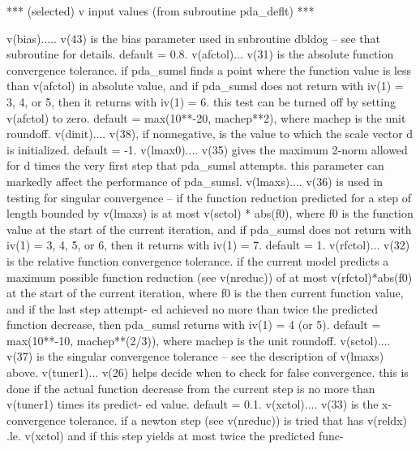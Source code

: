 \documentclass[11pt,twoside,nolof]{starlink}
\begin{document}
\begin{terminalv}
   ***  (selected) v input values (from subroutine pda_deflt)  ***

  v(bias)..... v(43) is the bias parameter used in subroutine dbldog --
              see that subroutine for details.  default = 0.8.
  v(afctol)... v(31) is the absolute function convergence tolerance.
              if pda_sumsl finds a point where the function value is less
              than v(afctol) in absolute value, and if pda_sumsl does not
              return with iv(1) = 3, 4, or 5, then it returns with
              iv(1) = 6.  this test can be turned off by setting
              v(afctol) to zero.  default = max(10**-20, machep**2),
              where machep is the unit roundoff.
  v(dinit).... v(38), if nonnegative, is the value to which the scale
              vector d is initialized.  default = -1.
  v(lmax0).... v(35) gives the maximum 2-norm allowed for d times the
              very first step that pda_sumsl attempts.  this parameter can
              markedly affect the performance of pda_sumsl.
  v(lmaxs).... v(36) is used in testing for singular convergence -- if
              the function reduction predicted for a step of length
              bounded by v(lmaxs) is at most v(sctol) * abs(f0), where
              f0  is the function value at the start of the current
              iteration, and if pda_sumsl does not return with iv(1) = 3,
              4, 5, or 6, then it returns with iv(1) = 7.  default = 1.
  v(rfctol)... v(32) is the relative function convergence tolerance.
              if the current model predicts a maximum possible function
              reduction (see v(nreduc)) of at most v(rfctol)*abs(f0)
              at the start of the current iteration, where  f0  is the
              then current function value, and if the last step attempt-
              ed achieved no more than twice the predicted function
              decrease, then pda_sumsl returns with iv(1) = 4 (or 5).
              default = max(10**-10, machep**(2/3)), where machep is
              the unit roundoff.
  v(sctol).... v(37) is the singular convergence tolerance -- see the
              description of v(lmaxs) above.
  v(tuner1)... v(26) helps decide when to check for false convergence.
              this is done if the actual function decrease from the
              current step is no more than v(tuner1) times its predict-
              ed value.  default = 0.1.
  v(xctol).... v(33) is the x-convergence tolerance.  if a newton step
              (see v(nreduc)) is tried that has v(reldx) .le. v(xctol)
              and if this step yields at most twice the predicted func-

\end{terminalv}
\end{document}
